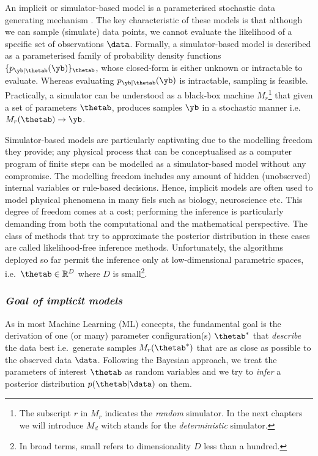 An implicit or simulator-based model is a parameterised stochastic
data generating mechanism \cite{Gutmann2016}. The key characteristic
of these models is that although we can sample (simulate) data points,
we cannot evaluate the likelihood of a specific set of observations
$\data$. Formally, a simulator-based model is described as a
parameterised family of probability density functions
$\{ p_{\yb|\thetab}(\yb) \}_{\thetab}$, whose closed-form is either
unknown or intractable to evaluate. Whereas evaluating
$p_{\yb|\thetab}(\yb)$ is intractable, sampling is
feasible. Practically, a simulator can be understood as a black-box
machine $M_r$\footnote{The subscript $r$ in $M_r$ indicates the
  \textit{random} simulator. In the next chapters we will introduce
  $M_d$ witch stands for the \textit{deterministic} simulator.} that
given a set of parameters $\thetab$, produces samples $\yb$ in a
stochastic manner i.e.\ $M_r(\thetab) \rightarrow \yb$.

Simulator-based models are particularly captivating due to the
modelling freedom they provide; any physical process that can be
conceptualised as a computer program of finite steps can be modelled
as a simulator-based model without any compromise. The modelling
freedom includes any amount of hidden (unobserved) internal variables
or rule-based decisions. Hence, implicit models are often used to
model physical phenomena in many fiels such as biology, neuroscience
etc. This degree of freedom comes at a cost; performing the inference
is particularly demanding from both the computational and the
mathematical perspective. The class of methods that try to approximate
the posterior distribution in these cases are called likelihood-free
inference methods. Unfortunately, the algorithms deployed so far
permit the inference only at low-dimensional parametric spaces, i.e.\
$\thetab \in \mathbb{R}^D$ where $D$ is small\footnote{In broad terms,
  small refers to dimensionality $D$ less than a hundred.}.

\subsubsection*{\textit{Goal of implicit models}}

As in most Machine Learning (ML) concepts, the fundamental goal is the
derivation of one (or many) parameter configuration(s) $\thetab^*$
that \textit{describe} the data best i.e.\ generate samples
$M_r(\thetab^*)$ that are as close as possible to the observed data
$\data$. Following the Bayesian approach, we treat the
parameters of interest $\thetab$ as random variables and we try to
\textit{infer} a posterior distribution $p(\thetab|\data)$ on them.

